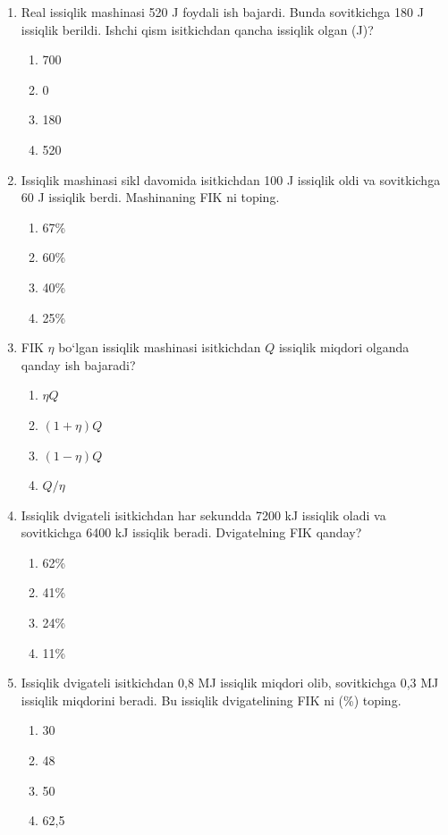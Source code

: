 \begin{enumerate}
\item Real issiqlik mashinasi 520 J foydali ish bajardi. Bunda sovitkichga 180 J issiqlik berildi. Ishchi qism isitkichdan qancha issiqlik olgan (J)?
\begin{enumerate}[label=\Alph*)]
\item 700
\item 0
\item 180
\item 520
\end{enumerate}

\item Issiqlik mashinasi sikl davomida isitkichdan 100 J issiqlik oldi va sovitkichga 60 J issiqlik berdi. Mashinaning FIK ni toping.
\begin{enumerate}[label=\Alph*)]
\item 67\%
\item 60\%
\item 40\%
\item 25\%
\end{enumerate}

\item FIK $\eta$ bo‘lgan issiqlik mashinasi isitkichdan $Q$ issiqlik miqdori olganda qanday ish bajaradi?
\begin{enumerate}[label=\Alph*)]
\item $\eta Q$
\item $(1 + \eta)Q$
\item $(1 - \eta)Q$
\item $Q / \eta$
\end{enumerate}

\item Issiqlik dvigateli isitkichdan har sekundda 7200 kJ issiqlik oladi va sovitkichga 6400 kJ issiqlik beradi. Dvigatelning FIK qanday?
\begin{enumerate}[label=\Alph*)]
\item 62\%
\item 41\%
\item 24\%
\item 11\%
\end{enumerate}

\item Issiqlik dvigateli isitkichdan 0,8 MJ issiqlik miqdori olib, sovitkichga 0,3 MJ issiqlik miqdorini beradi. Bu issiqlik dvigatelining FIK ni (\%) toping.
\begin{enumerate}[label=\Alph*)]
\item 30
\item 48
\item 50
\item 62,5
\end{enumerate}


\end{enumerate}
